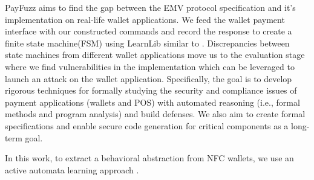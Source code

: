 PayFuzz aims to find the gap between the EMV protocol specification and it's implementation on real-life wallet 
applications. We feed the wallet payment interface with our constructed commands and record the response to 
create a finite state machine(FSM) using LearnLib similar to \cite{formalmodels}. Discrepancies between state 
machines from different wallet applications move us to the evaluation stage where we find vulnerabilities in 
the implementation which can be leveraged to launch an attack on the wallet application. Specifically, the goal is to 
develop rigorous techniques for formally studying the security and compliance issues of payment applications 
(wallets and POS) with automated reasoning (i.e., formal methods and program analysis) and build defenses. We also 
aim to create formal specifications and enable secure code generation for critical components as a long-term goal.



In this work, to extract a behavioral abstraction from NFC wallets, we use an active automata learning approach \cite{dikeue} 
\cite{dynamictesting}. 
